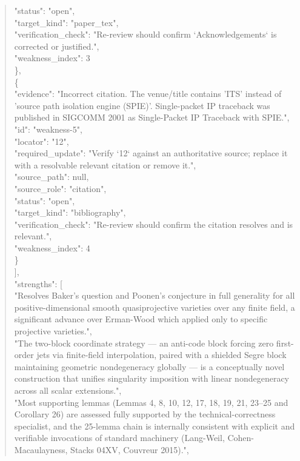 \documentclass[11pt]{article}
\begin{document}
\begin{quote}
      "status": "open",\\
      "target\_kind": "paper\_tex",\\
      "verification\_check": "Re-review should confirm `Acknowledgements` is corrected or justified.",\\
      "weakness\_index": 3\\
    \},\\
    \{\\
      "evidence": "Incorrect citation. The venue/title contains 'ITS' instead of 'source path isolation engine (SPIE)'. Single-packet IP traceback was published in SIGCOMM 2001 as Single-Packet IP Traceback with SPIE.",\\
      "id": "weakness-5",\\
      "locator": "12",\\
      "required\_update": "Verify `12` against an authoritative source; replace it with a resolvable relevant citation or remove it.",\\
      "source\_path": null,\\
      "source\_role": "citation",\\
      "status": "open",\\
      "target\_kind": "bibliography",\\
      "verification\_check": "Re-review should confirm the citation resolves and is relevant.",\\
      "weakness\_index": 4\\
    \}\\
  ],\\
  "strengths": [\\
    "Resolves Baker's question and Poonen's conjecture in full generality for all positive-dimensional smooth quasiprojective varieties over any finite field, a significant advance over Erman-Wood which applied only to specific projective varieties.",\\
    "The two-block coordinate strategy --- an anti-code block forcing zero first-order jets via finite-field interpolation, paired with a shielded Segre block maintaining geometric nondegeneracy globally --- is a conceptually novel construction that unifies singularity imposition with linear nondegeneracy across all scalar extensions.",\\
    "Most supporting lemmas (Lemmas 4, 8, 10, 12, 17, 18, 19, 21, 23--25 and Corollary 26) are assessed fully supported by the technical-correctness specialist, and the 25-lemma chain is internally consistent with explicit and verifiable invocations of standard machinery (Lang-Weil, Cohen-Macaulayness, Stacks 04XV, Couvreur 2015).",\\

\end{quote}
\end{document}
